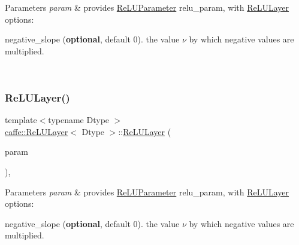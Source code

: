 \begin{DoxyParams}{Parameters}
{\em param} & provides \mbox{\hyperlink{classcaffe_1_1_re_l_u_parameter}{Re\+L\+U\+Parameter}} relu\+\_\+param, with \mbox{\hyperlink{classcaffe_1_1_re_l_u_layer}{Re\+L\+U\+Layer}} options\+:
\begin{DoxyItemize}
\item negative\+\_\+slope ({\bfseries optional}, default 0). the value $ \nu $ by which negative values are multiplied. 
\end{DoxyItemize}\\
\hline
\end{DoxyParams}
\mbox{\label{classcaffe_1_1_re_l_u_layer_aa6770fbbfd5e6f564c2ca19de7f7e712}} 
\subsubsection{\texorpdfstring{Re\+L\+U\+Layer()}{ReLULayer()}\hspace{0.1cm}{\footnotesize\ttfamily [2/2]}}
{\footnotesize\ttfamily template$<$typename Dtype $>$ \\
\mbox{\hyperlink{classcaffe_1_1_re_l_u_layer}{caffe\+::\+Re\+L\+U\+Layer}}$<$ Dtype $>$\+::\mbox{\hyperlink{classcaffe_1_1_re_l_u_layer}{Re\+L\+U\+Layer}} (\begin{DoxyParamCaption}\item[{const \mbox{\hyperlink{classcaffe_1_1_layer_parameter}{Layer\+Parameter}} \&}]{param }\end{DoxyParamCaption})\hspace{0.3cm}{\ttfamily [inline]}, {\ttfamily [explicit]}}


\begin{DoxyParams}{Parameters}
{\em param} & provides \mbox{\hyperlink{classcaffe_1_1_re_l_u_parameter}{Re\+L\+U\+Parameter}} relu\+\_\+param, with \mbox{\hyperlink{classcaffe_1_1_re_l_u_layer}{Re\+L\+U\+Layer}} options\+:
\begin{DoxyItemize}
\item negative\+\_\+slope ({\bfseries optional}, default 0). the value $ \nu $ by which negative values are multiplied. 
\end{DoxyItemize}\\
\hline
\end{DoxyParams}


